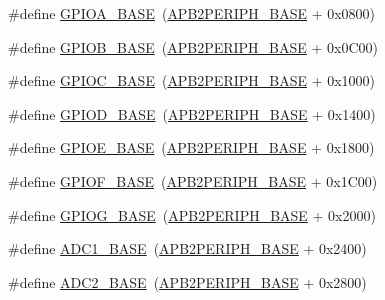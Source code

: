 \begin{DoxyCompactItemize}
\item 
\#define \hyperlink{group___peripheral__memory__map_gad7723846cc5db8e43a44d78cf21f6efa}{G\+P\+I\+O\+A\+\_\+\+B\+A\+SE}~(\hyperlink{group___peripheral__memory__map_ga25b99d6065f1c8f751e78f43ade652cb}{A\+P\+B2\+P\+E\+R\+I\+P\+H\+\_\+\+B\+A\+SE} + 0x0800)
\item 
\#define \hyperlink{group___peripheral__memory__map_gac944a89eb789000ece920c0f89cb6a68}{G\+P\+I\+O\+B\+\_\+\+B\+A\+SE}~(\hyperlink{group___peripheral__memory__map_ga25b99d6065f1c8f751e78f43ade652cb}{A\+P\+B2\+P\+E\+R\+I\+P\+H\+\_\+\+B\+A\+SE} + 0x0\+C00)
\item 
\#define \hyperlink{group___peripheral__memory__map_ga26f267dc35338eef219544c51f1e6b3f}{G\+P\+I\+O\+C\+\_\+\+B\+A\+SE}~(\hyperlink{group___peripheral__memory__map_ga25b99d6065f1c8f751e78f43ade652cb}{A\+P\+B2\+P\+E\+R\+I\+P\+H\+\_\+\+B\+A\+SE} + 0x1000)
\item 
\#define \hyperlink{group___peripheral__memory__map_ga1a93ab27129f04064089616910c296ec}{G\+P\+I\+O\+D\+\_\+\+B\+A\+SE}~(\hyperlink{group___peripheral__memory__map_ga25b99d6065f1c8f751e78f43ade652cb}{A\+P\+B2\+P\+E\+R\+I\+P\+H\+\_\+\+B\+A\+SE} + 0x1400)
\item 
\#define \hyperlink{group___peripheral__memory__map_gab487b1983d936c4fee3e9e88b95aad9d}{G\+P\+I\+O\+E\+\_\+\+B\+A\+SE}~(\hyperlink{group___peripheral__memory__map_ga25b99d6065f1c8f751e78f43ade652cb}{A\+P\+B2\+P\+E\+R\+I\+P\+H\+\_\+\+B\+A\+SE} + 0x1800)
\item 
\#define \hyperlink{group___peripheral__memory__map_ga7f9a3f4223a1a784af464a114978d26e}{G\+P\+I\+O\+F\+\_\+\+B\+A\+SE}~(\hyperlink{group___peripheral__memory__map_ga25b99d6065f1c8f751e78f43ade652cb}{A\+P\+B2\+P\+E\+R\+I\+P\+H\+\_\+\+B\+A\+SE} + 0x1\+C00)
\item 
\#define \hyperlink{group___peripheral__memory__map_ga5d8ca4020f2e8c00bde974e8e7c13cfe}{G\+P\+I\+O\+G\+\_\+\+B\+A\+SE}~(\hyperlink{group___peripheral__memory__map_ga25b99d6065f1c8f751e78f43ade652cb}{A\+P\+B2\+P\+E\+R\+I\+P\+H\+\_\+\+B\+A\+SE} + 0x2000)
\item 
\#define \hyperlink{group___peripheral__memory__map_ga695c9a2f892363a1c942405c8d351b91}{A\+D\+C1\+\_\+\+B\+A\+SE}~(\hyperlink{group___peripheral__memory__map_ga25b99d6065f1c8f751e78f43ade652cb}{A\+P\+B2\+P\+E\+R\+I\+P\+H\+\_\+\+B\+A\+SE} + 0x2400)
\item 
\#define \hyperlink{group___peripheral__memory__map_ga6544abc57f9759f610eee09a02442ae6}{A\+D\+C2\+\_\+\+B\+A\+SE}~(\hyperlink{group___peripheral__memory__map_ga25b99d6065f1c8f751e78f43ade652cb}{A\+P\+B2\+P\+E\+R\+I\+P\+H\+\_\+\+B\+A\+SE} + 0x2800)

\end{DoxyCompactItemize}
